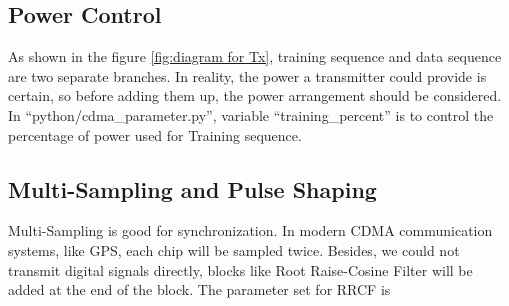 \documentclass[a4paper]{report}
\begin{document}
\subsection{Power Control} %
\label{sub:power_control}
As shown in the figure \ref{fig:diagram for Tx}, training sequence and data sequence are two separate branches. In reality, the power a transmitter could provide is certain, so before adding them up, the power arrangement should be considered. In ``python/cdma\_parameter.py'', variable ``training\_percent'' is to control the percentage of power used for Training sequence. 

\subsection{Multi-Sampling and Pulse Shaping} %
\label{sub:multi_sampling}
Multi-Sampling is good for synchronization. In modern CDMA communication systems, like GPS, each chip will be sampled twice. Besides, we could not transmit digital signals directly, blocks like Root Raise-Cosine Filter will be added at the end of the block. The parameter set for RRCF is 






\end{document}
